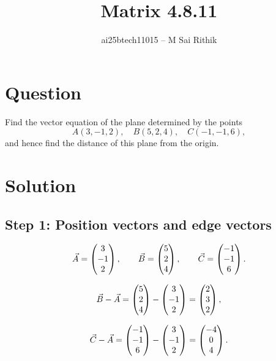 \documentclass[12pt]{article}
\title{Matrix 4.8.11}
\author{ai25btech11015 -- M Sai Rithik}
\date{}
\begin{document}
\maketitle

\section*{Question}
Find the vector equation of the plane determined by the points
\[
A(3,-1,2),\quad B(5,2,4),\quad C(-1,-1,6),
\]
and hence find the distance of this plane from the origin.  

\section*{Solution}

\subsection*{Step 1: Position vectors and edge vectors}
\begin{equation}
\Vec{A} = \begin{pmatrix}3 \\ -1 \\ 2\end{pmatrix},\qquad
\Vec{B} = \begin{pmatrix}5 \\ 2 \\ 4\end{pmatrix},\qquad
\Vec{C} = \begin{pmatrix}-1 \\ -1 \\ 6\end{pmatrix}.
\end{equation}

\begin{equation}
\Vec{B}-\Vec{A} = \begin{pmatrix}5 \\ 2 \\ 4\end{pmatrix} - \begin{pmatrix}3 \\ -1 \\ 2\end{pmatrix}
= \begin{pmatrix}2 \\ 3 \\ 2\end{pmatrix},
\end{equation}

\begin{equation}
\Vec{C}-\Vec{A} = \begin{pmatrix}-1 \\ -1 \\ 6\end{pmatrix} - \begin{pmatrix}3 \\ -1 \\ 2\end{pmatrix}
= \begin{pmatrix}-4 \\ 0 \\ 4\end{pmatrix}.
\end{equation}
\end{document}
